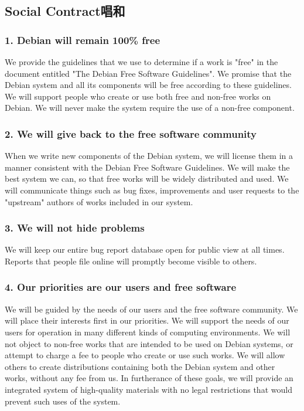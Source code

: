 \documentclass[cjk,dvipdfmx]{beamer}
\begin{document}
\subsection{Social Contract唱和}
\begin{frame}
\frametitle{1. Debian will remain 100\% free} 

       We provide the guidelines that we use to determine if a work is
       "free" in the document entitled "The Debian Free Software
       Guidelines". We promise that the Debian system and all its
       components will be free according to these guidelines. We will
       support people who create or use both free and non-free works on
       Debian. We will never make the system require the use of a
       non-free component.
\end{frame}
\begin{frame}
\frametitle{2. We will give back to the free software community} 
 
    
       When we write new components of the Debian system, we will license
       them in a manner consistent with the Debian Free Software
       Guidelines. We will make the best system we can, so that free
       works will be widely distributed and used. We will communicate
       things such as bug fixes, improvements and user requests to the
       "upstream" authors of works included in our system.
\end{frame}
\begin{frame}
\frametitle{3. We will not hide problems} 
 

       We will keep our entire bug report database open for public view
       at all times. Reports that people file online will promptly become
       visible to others.
\end{frame}
\begin{frame}
\frametitle{4. Our priorities are our users and free software} 
       We will be guided by the needs of our users and the free software
       community. We will place their interests first in our priorities.
       We will support the needs of our users for operation in many
       different kinds of computing environments. We will not object to
       non-free works that are intended to be used on Debian systems, or
       attempt to charge a fee to people who create or use such works. We
       will allow others to create distributions containing both the
       Debian system and other works, without any fee from us. In
       furtherance of these goals, we will provide an integrated system
       of high-quality materials with no legal restrictions that would
       prevent such uses of the system.
\end{frame}
\end{document}
